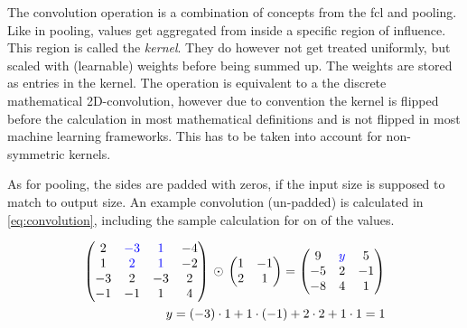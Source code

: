 The convolution operation is a combination of concepts from the fcl and pooling.
Like in pooling, values get aggregated from inside a specific region of influence.
This region is called the \emph{kernel}.
They do however not get treated uniformly, but scaled with (learnable) weights before being summed up.
The weights are stored as entries in the kernel. 
The operation is equivalent to a the discrete mathematical 2D-convolution, however due to convention the kernel is flipped before the calculation in most mathematical definitions \cite{multidimConv} and is not flipped in most machine learning frameworks.
This has to be taken into account for non-symmetric kernels.

As for pooling, the sides are padded with zeros, if the input size is supposed to match to output size. 
An example convolution (un-padded) is calculated in \autoref{eq:convolution}, including the sample calculation for on of the values.

\begin{equation}
    \label{eq:convolution}
    \begin{split}
        \left(\begin{matrix}
            2 & \textcolor{blue}{-3} & \textcolor{blue}{1} & -4 \\
            1 & \textcolor{blue}{2} & \textcolor{blue}{1} & -2 \\
            -3 & 2 & -3 & 2 \\
            -1 & -1 & 1 & 4 \\
        \end{matrix}\right)\,\odot\,
        \left(\begin{matrix}
            1 & -1  \\
            2 & 1   \\
        \end{matrix}\right) = 
        \left(\begin{matrix}
            9 & \textcolor{blue}{y} & 5 \\
            -5 & 2 & -1 \\
            -8 & 4 & 1 \\
        \end{matrix}\right)\\
        y = (-3)\cdot 1 + 1 \cdot (-1) + 2 \cdot 2 + 1 \cdot 1 = 1
    \end{split}
\end{equation}

